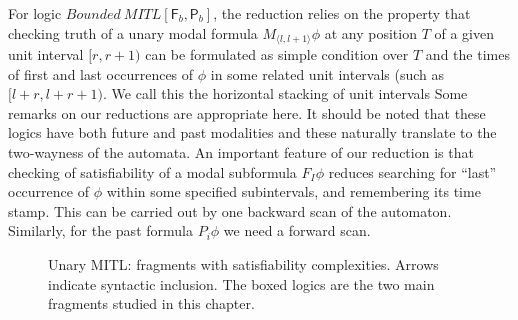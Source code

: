 \documentclass{llncs}
\newcommand{\class}{\textsc}
\newcommand{\until}{\textsf{U}}
\newcommand{\since}{\textsf{S}}
\newcommand{\fut}{\textsf{F}}
\newcommand{\past}{\textsf{P}}
\newcommand{\mitlus}{\mbox{$\mathit{MITL[\until_I,\since_I]}$}}
\newcommand{\bmtlus}{\mbox{$\mathit{Bounded ~MTL[\until_b,\since_b]}$}}
\newcommand{\mitlfp}{\mbox{$\mathit{MITL[\fut_I,\past_I]}$}}
\newcommand{\bmitlfp}{\mbox{$\mathit{Bounded ~MITL[\fut_b,\past_b]}$}}
\newcommand{\ttl}{\mbox{$\mathit{TTL[X_\theta, Y_\theta]}$}}
\newcommand{\mitlf}{\mbox{$\mathit{MITL[\fut_I]}$}}
\newcommand{\mitlfpinf}{\mbox{$\mathit{MITL[\fut_\infty,\past_\infty]}$}}
\newcommand{\mitlusinf}{\mbox{$\mathit{MITL[\until_\infty,\since_\infty]}$}}
\newcommand{\mitlfpb}{\bmitlfp}
\newcommand{\mtlusb}{\bmtlus}
\newcommand{\mitlfb}{\mbox{$\mathit{Bounded ~MITL[\fut_b]}$}}
\newcommand{\mitluszinf}{\mbox{$\mathit{MITL[\until_{0,\infty},\since_{0,\infty}]}$}}
\newcommand{\mitlfpzinf}{\mbox{$\mathit{MITL[\fut_{0,\infty},\past_{0,\infty}]}$}}
\newcommand{\mitlfinf}{\mbox{$\mathit{MITL[\fut_{\infty}]}$}}
\newcommand{\mitlfz}{\mbox{$\mathit{MITL[\fut_{0}]}$}}
\newcommand{\pspace}{\mbox{$\class{PSPACE}$}}
\newcommand{\expspace}{\mbox{$\class{EXPSPACE}$}}
\newcommand{\np}{\mbox{$\class{NP}$}}
\newcommand{\nexp}{\mbox{$\class{NEXPTIME}$}}
\begin{document}
For logic $\mitlfpb$, the reduction relies on the property that checking truth of a unary modal formula $M_{\langle l,l+1 \rangle} \phi$ at any position $T$ of a given unit interval $[r,r+1)$ can be formulated as simple condition over $T$ and the times of
first and last occurrences of $\phi$ in some related unit intervals (such as
$[l+r,l+r+1)$. We call this the horizontal stacking of unit intervals
Some remarks on our reductions are appropriate here.
It should be noted that these logics have both future and past modalities and these naturally translate to the two-wayness of the automata. An important feature of our reduction is that checking of satisfiability of a modal subformula $F_I \phi$ reduces searching for ``last'' occurrence of  $\phi$ within some specified subintervals, and remembering its time stamp. This can be carried out by one backward scan of the automaton.  Similarly, for the past formula $P_i \phi$ we need a forward scan.


\begin{figure}
\caption{Unary MITL: fragments with satisfiability complexities. Arrows indicate syntactic inclusion. The boxed logics are the two main fragments studied in this chapter.}
\label{fig:complexity}
\end{figure}
\end{document}

